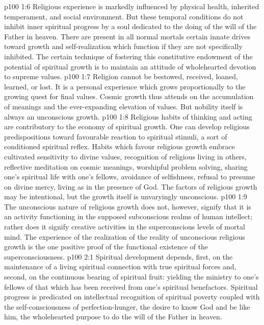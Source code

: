 \vs p100 1:6 \pc Religious experience is markedly influenced by physical health, inherited temperament, and social environment. But these temporal conditions do not inhibit inner spiritual progress by a soul dedicated to the doing of the will of the Father in heaven. There are present in all normal mortals certain innate drives toward growth and self\hyp{}realization which function if they are not specifically inhibited. The certain technique of fostering this constitutive endowment of the potential of spiritual growth is to maintain an attitude of wholehearted devotion to supreme values.
\vs p100 1:7 Religion cannot be bestowed, received, loaned, learned, or lost. It is a personal experience which grows proportionally to the growing quest for final values. Cosmic growth thus attends on the accumulation of meanings and the ever\hyp{}expanding elevation of values. But nobility itself is always an unconscious growth.
\vs p100 1:8 Religious habits of thinking and acting are contributory to the economy of spiritual growth. One can develop religious predispositions toward favourable reaction to spiritual stimuli, a sort of conditioned spiritual reflex. Habits which favour religious growth embrace cultivated sensitivity to divine values, recognition of religious living in others, reflective meditation on cosmic meanings, worshipful problem solving, sharing one’s spiritual life with one’s fellows, avoidance of selfishness, refusal to presume on divine mercy, living as in the presence of God. The factors of religious growth may be intentional, but the growth itself is unvaryingly unconscious.
\vs p100 1:9 The unconscious nature of religious growth does not, however, signify that it is an activity functioning in the supposed subconscious realms of human intellect; rather does it signify creative activities in the superconscious levels of mortal mind. The experience of the realization of the reality of unconscious religious growth is the one positive proof of the functional existence of the superconsciousness.
\vs p100 2:1 Spiritual development depends, first, on the maintenance of a living spiritual connection with true spiritual forces and, second, on the continuous bearing of spiritual fruit: yielding the ministry to one’s fellows of that which has been received from one’s spiritual benefactors. Spiritual progress is predicated on intellectual recognition of spiritual poverty coupled with the self\hyp{}consciousness of perfection\hyp{}hunger, the desire to know God and be like him, the wholehearted purpose to do the will of the Father in heaven.
